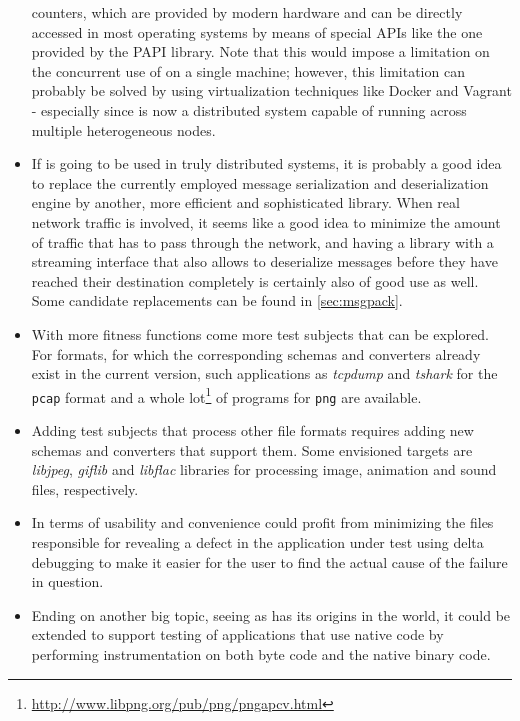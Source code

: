 \begin{itemize}
counters, which are provided by modern hardware and can be directly accessed in most operating systems by
means of special APIs like the one provided by the {\small PAPI}\cite{Mucci99papi:a} library. Note that
this would impose a limitation on the concurrent use of \xmlmate on a single machine; however, this limitation
can probably be solved by using virtualization techniques like {\small Docker}\cite{docker} and {\small
Vagrant}\cite{vagrant} - especially since \xmlmate is now a distributed system capable of running across
multiple heterogeneous nodes.
\item[]If \xmlmate is going to be used in truly distributed systems, it is probably a good idea to replace
the currently employed \msgpack message serialization and deserialization engine by another, more efficient and
sophisticated library. When real network traffic is involved, it seems like a good idea to minimize the amount
of traffic that has to pass through the network, and having a library with a streaming interface that also
allows to deserialize messages before they have reached their destination completely is certainly also of
good use as well. Some candidate replacements can be found in \cref{sec:msgpack}.
\item[]With more fitness functions come more test subjects that can be explored. For formats, for which the
corresponding schemas and converters already exist in the current version, such applications as \emph{tcpdump}
and \emph{tshark} for the \texttt{pcap} format and a whole
lot\footnote{\url{http://www.libpng.org/pub/png/pngapcv.html}} of programs for \texttt{png} are available.
\item[]Adding test subjects that process other file formats requires adding new schemas and converters that
support them. Some envisioned targets are \emph{libjpeg}, \emph{giflib} and \emph{libflac} libraries for
processing image, animation and sound files, respectively.
\item[]In terms of usability and convenience \xmlmate could profit from minimizing the files responsible for
revealing a defect in the application under test using delta debugging\cite{zeller2002simplifying} to make it
easier for the user to find the actual cause of the failure in question.
\item[]Ending on another big topic, seeing as \xmlmate has its origins in the \java world, it could be extended
to support testing of \java applications that use native code by performing instrumentation on both \java
byte code and the native binary code.
\end{itemize}